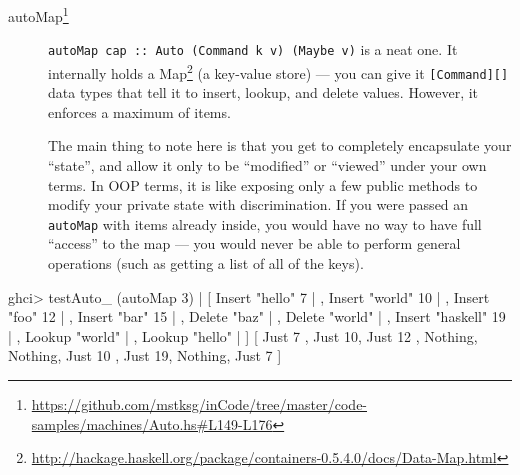 \documentclass[]{article}
\newenvironment{Shaded}{}{}
\newcommand{\DataTypeTok}[1]{\textcolor[rgb]{0.56,0.13,0.00}{#1}}
\newcommand{\DecValTok}[1]{\textcolor[rgb]{0.25,0.63,0.44}{#1}}
\newcommand{\NormalTok}[1]{#1}
\newcommand{\OperatorTok}[1]{\textcolor[rgb]{0.40,0.40,0.40}{#1}}
\newcommand{\StringTok}[1]{\textcolor[rgb]{0.25,0.44,0.63}{#1}}
\renewcommand{\href}[2]{#2\footnote{\url{#1}}}
\begin{document}
\begin{description}
\item[\href{https://github.com/mstksg/inCode/tree/master/code-samples/machines/Auto.hs\#L149-L176}{autoMap}]
\texttt{autoMap\ cap\ ::\ Auto\ (Command\ k\ v)\ (Maybe\ v)} is a neat one. It
internally holds a
\href{http://hackage.haskell.org/package/containers-0.5.4.0/docs/Data-Map.html}{Map}
(a key-value store) --- you can give it \texttt{{[}Command{]}{[}{]}} data types
that tell it to insert, lookup, and delete values. However, it enforces a
maximum of items.

The main thing to note here is that you get to completely encapsulate your
``state'', and allow it only to be ``modified'' or ``viewed'' under your own
terms. In OOP terms, it is like exposing only a few public methods to modify
your private state with discrimination. If you were passed an \texttt{autoMap}
with items already inside, you would have no way to have full ``access'' to the
map --- you would never be able to perform general operations (such as getting a
list of all of the keys).
\end{description}

\begin{Shaded}
\begin{Highlighting}[]
\NormalTok{ghci}\OperatorTok{\textgreater{}}\NormalTok{ testAuto\_ (autoMap }\DecValTok{3}\NormalTok{)}
    \OperatorTok{|}\NormalTok{   [ }\DataTypeTok{Insert} \StringTok{"hello"} \DecValTok{7}
    \OperatorTok{|}\NormalTok{   , }\DataTypeTok{Insert} \StringTok{"world"} \DecValTok{10}
    \OperatorTok{|}\NormalTok{   , }\DataTypeTok{Insert} \StringTok{"foo"} \DecValTok{12}
    \OperatorTok{|}\NormalTok{   , }\DataTypeTok{Insert} \StringTok{"bar"} \DecValTok{15}
    \OperatorTok{|}\NormalTok{   , }\DataTypeTok{Delete} \StringTok{"baz"}
    \OperatorTok{|}\NormalTok{   , }\DataTypeTok{Delete} \StringTok{"world"}
    \OperatorTok{|}\NormalTok{   , }\DataTypeTok{Insert} \StringTok{"haskell"} \DecValTok{19}
    \OperatorTok{|}\NormalTok{   , }\DataTypeTok{Lookup} \StringTok{"world"}
    \OperatorTok{|}\NormalTok{   , }\DataTypeTok{Lookup} \StringTok{"hello"}
    \OperatorTok{|}\NormalTok{   ]}
\NormalTok{[ }\DataTypeTok{Just} \DecValTok{7}\NormalTok{ , }\DataTypeTok{Just} \DecValTok{10}\NormalTok{, }\DataTypeTok{Just} \DecValTok{12}
\NormalTok{, }\DataTypeTok{Nothing}\NormalTok{, }\DataTypeTok{Nothing}\NormalTok{, }\DataTypeTok{Just} \DecValTok{10}
\NormalTok{, }\DataTypeTok{Just} \DecValTok{19}\NormalTok{, }\DataTypeTok{Nothing}\NormalTok{, }\DataTypeTok{Just} \DecValTok{7}\NormalTok{  ]}
\end{Highlighting}
\end{Shaded}
\end{document}
